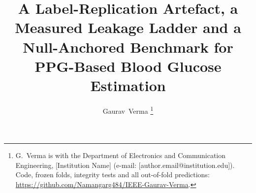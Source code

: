 \documentclass[journal]{IEEEtran}
\begin{document}
\title{A Label-Replication Artefact, a Measured Leakage Ladder and a
       Null-Anchored Benchmark for PPG-Based Blood Glucose Estimation}

\author{Gaurav~Verma%
\thanks{G.~Verma is with the Department of Electronics and Communication
Engineering, [Institution Name] (e-mail: [author.email@institution.edu]).
Code, frozen folds, integrity tests and all out-of-fold predictions:
\url{https://github.com/Namangarg484/IEEE-Gaurav-Verma}.}}


\maketitle
\end{document}
